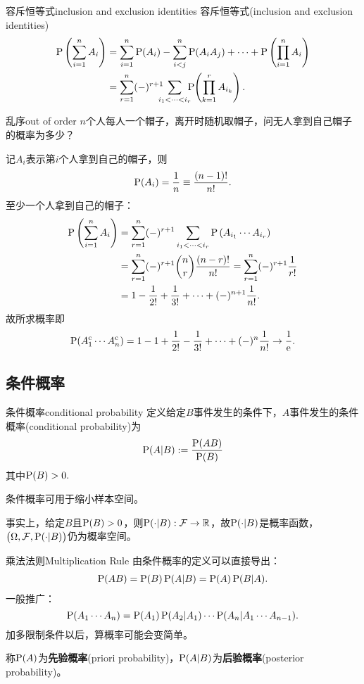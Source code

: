 \begin{theorem}{容斥恒等式}{inclusion and exclusion identities}
	容斥恒等式(inclusion and exclusion identities)
	\begin{align}\notag
		\P\kh{\sum_{i=1}^nA_i}&=\sum_{i=1}^n\P(A_i)-\sum_{i<j}^n\P(A_iA_j)+\cdots+\P\kh{\prod_{i=1}^nA_i}\\
		&=\sum_{r=1}^n(-)^{r+1}\bs7\sum_{i_1<\cdots<i_r}\bs5\P\bs2\kh{\prod_{k=1}^rA_{i_k}}.
	\end{align}
\end{theorem}
\begin{example}{乱序}{out of order}
	$n$个人每人一个帽子，离开时随机取帽子，问无人拿到自己帽子的概率为多少？

	记$A_i$表示第$i$个人拿到自己的帽子，则
	\[
		\P(A_i)=\frac1n\equiv\frac{(n-1)!}{n!}.
	\]
	至少一个人拿到自己的帽子：
	\begin{align*}
		\P\kh{\sum_{i=1}^nA_i}&=\sum_{r=1}^n(-)^{r+1}\sum_{i_1<\cdots<i_r}\P\kh{A_{i_1}\cdots A_{i_r}}\\
		&=\sum_{r=1}^n(-)^{r+1}{n\choose r}\frac{(n-r)!}{n!}=\sum_{r=1}^n(-)^{r+1}\frac1{r!}\\
		&=1-\frac1{2!}+\frac1{3!}+\cdots+(-)^{n+1}\frac1{n!}.
	\end{align*}
	故所求概率即
	\[
		\P(A_1\c\cdots A_n\c)=1-1+\frac1{2!}-\frac1{3!}+\cdots+(-)^n\frac1{n!}\to\frac1{\e{}}.
	\]
\end{example}
\subsection{条件概率}
\begin{definition}{条件概率}{conditional probability}
	定义给定$B$事件发生的条件下，$A$事件发生的条件概率(conditional probability)为
	\begin{align}
		\P(A|B):=\frac{\P(AB)}{\P(B)}
	\end{align}
	其中$\P(B)>0.$
\end{definition}
条件概率可用于缩小样本空间。

事实上，给定$B$且$\P(B)>0$，则$\P(\cdot|B):\cF\to\RR$，故$\P(\cdot|B)$是概率函数，$\bigkh{\Omega,\cF,\P(\cdot|B)}$仍为概率空间。
\begin{theorem}{乘法法则}{Multiplication Rule}
	由条件概率的定义可以直接导出：
	\begin{align}
		\P(AB)=\P(B)\P(A|B)=\P(A)\P(B|A).
	\end{align}
	一般推广：
	\[
		\P(A_1\cdots A_n)=\P(A_1)\P(A_2|A_1)\cdots\P(A_n|A_1\cdots A_{n-1}).
	\]
	加多限制条件以后，算概率可能会变简单。
\end{theorem}
称$\P(A)$为\textbf{先验概率}(priori probability)，$\P(A|B)$为\textbf{后验概率}(posterior probability)。


